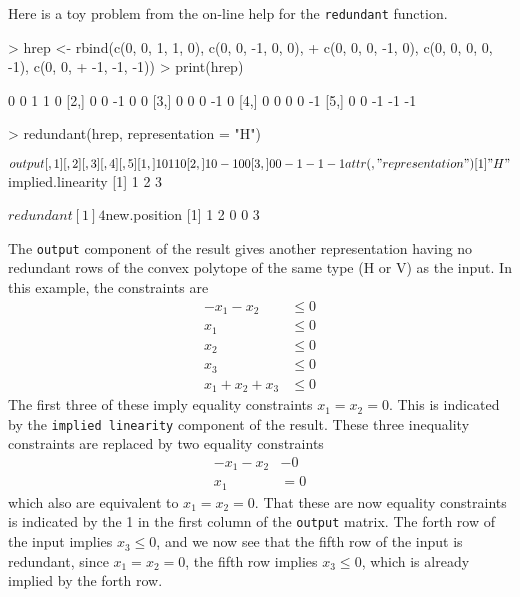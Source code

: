 \documentclass{article}
\begin{document}
Here is a toy problem from the on-line help for the \texttt{redundant}
function.
\begin{Schunk}
\begin{Sinput}
> hrep <- rbind(c(0, 0, 1, 1, 0), c(0, 0, -1, 0, 0), 
+     c(0, 0, 0, -1, 0), c(0, 0, 0, 0, -1), c(0, 0, 
+         -1, -1, -1))
> print(hrep)
\end{Sinput}
\begin{Soutput}
     [,1] [,2] [,3] [,4] [,5]
[1,]    0    0    1    1    0
[2,]    0    0   -1    0    0
[3,]    0    0    0   -1    0
[4,]    0    0    0    0   -1
[5,]    0    0   -1   -1   -1
\end{Soutput}
\begin{Sinput}
> redundant(hrep, representation = "H")
\end{Sinput}
\begin{Soutput}
$output
     [,1] [,2] [,3] [,4] [,5]
[1,]    1    0    1    1    0
[2,]    1    0   -1    0    0
[3,]    0    0   -1   -1   -1
attr(,"representation")
[1] "H"

$implied.linearity
[1] 1 2 3

$redundant
[1] 4

$new.position
[1] 1 2 0 0 3
\end{Soutput}
\end{Schunk}

The \texttt{output} component of the result gives another representation
having no redundant rows of the convex polytope of the same type (H or V)
as the input.  In this example, the constraints are
\begin{align*}
    - x_1 - x_2 & \le 0
    \\
    x_1 & \le 0
    \\
    x_2 & \le 0
    \\
    x_3 & \le 0
    \\
    x_1 + x_2 + x_3 & \le 0
\end{align*}
The first three of these imply equality constraints $x_1 = x_2 = 0$.
This is indicated by the \texttt{implied linearity} component of the result. 
These three inequality constraints are replaced by two equality constraints
\begin{align*}
    - x_1 - x_2 & - 0
    \\
    x_1 & = 0
\end{align*}
which also are equivalent to $x_1 = x_2 = 0$.  That these are now equality
constraints is indicated by the 1 in the first column of the \texttt{output}
matrix.  The forth row of the input implies $x_3 \le 0$, and we now see
that the fifth row of the input is redundant, since $x_1 = x_2 = 0$,
the fifth row implies $x_3 \le 0$, which is already implied by the forth row.
\end{document}
